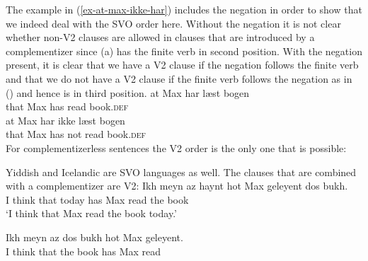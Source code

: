 \eal
{}
\zl
The example in (\ref{ex-at-max-ikke-har}) includes the negation in order to show that we indeed deal
with the SVO order here. Without the negation it is not clear whether non-V2 clauses are allowed in
clauses that are introduced by a complementizer since (a) has the finite verb in second
position. With the negation present, it is clear that we have a V2 clause if the negation follows
the finite verb and that we do not have a V2 clause if the finite verb follows the negation as in
() and hence is in third position.
\eal
\settowidth{}
\ex 
\gll at Max har læst bogen\\
     that Max has read book.\textsc{def}\\
\ex 
\gll at Max har ikke læst bogen\\
     that Max has not read book.\textsc{def}\\
\zl 
For complementizerless sentences the V2 order is the only one that is possible:
\eal
\settowidth{}
\zl 


Yiddish and Icelandic are SVO languages as well. The clauses that are combined with a
complementizer are V2:
\eal
\ex
\gll Ikh meyn  az   haynt hot Max geleyent dos bukh.\footnotemark\\
     I think that today has Max read the book\\\yiddish
{}
\glt `I think that Max read the book today.'

\ex%
\gll Ikh meyn  az   dos bukh hot Max geleyent.\\
     I think that the book has Max read\\

\zl
{}

